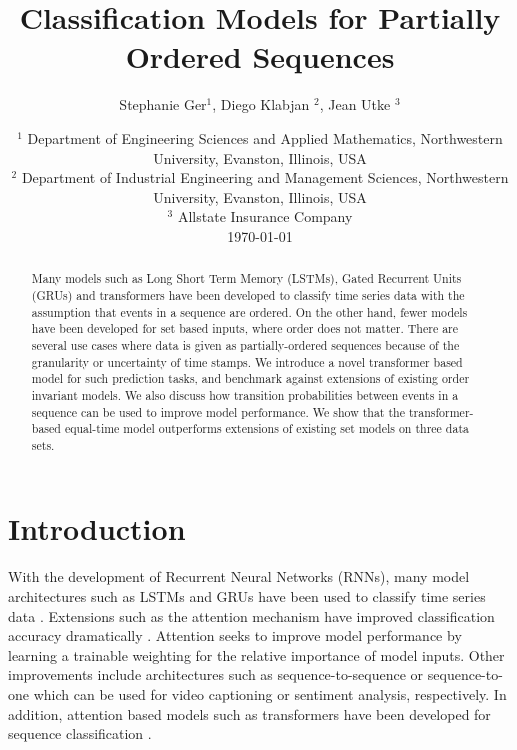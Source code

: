 \documentclass[reqno ,11pt]{article}
\begin{document}
\title{Classification Models for Partially Ordered Sequences} 
\author{Stephanie Ger$^1$, Diego Klabjan $^2$, Jean Utke $^3$}
\date
{$^1$ Department of Engineering Sciences and Applied Mathematics, Northwestern University, Evanston, Illinois, USA \\
$^2$ Department of Industrial Engineering and Management Sciences, Northwestern University, Evanston, Illinois, USA\\
$^3$ Allstate Insurance Company\\
\today}
\maketitle

\begin{abstract}
\noindent Many models such as Long Short Term Memory (LSTMs), Gated Recurrent Units (GRUs) and transformers have been developed to classify time series data with the assumption that events in a sequence are ordered. On the other hand, fewer models have been developed for set based inputs, where order does not matter. There are several use cases where data is given as partially-ordered sequences because of the granularity or uncertainty of time stamps. We introduce a novel transformer based model for such prediction tasks, and benchmark against extensions of existing order invariant models. We also discuss how transition probabilities between events in a sequence can be used to improve model performance. We show that the transformer-based equal-time model outperforms extensions of existing set models on three data sets. 
\end{abstract}


\section{Introduction}
With the development of Recurrent Neural Networks (RNNs), many model architectures such as LSTMs and GRUs have been used to classify time series data \cite{LSTM, GRU}. Extensions such as the attention mechanism have improved classification accuracy dramatically \cite{attention2015}. Attention seeks to improve model performance by learning a trainable weighting for the relative importance of model inputs. Other improvements include architectures such as sequence-to-sequence or sequence-to-one which can be used for video captioning or sentiment analysis, respectively. In addition, attention based models such as transformers have been developed for sequence classification \cite{transformer}. 
\end{document}
